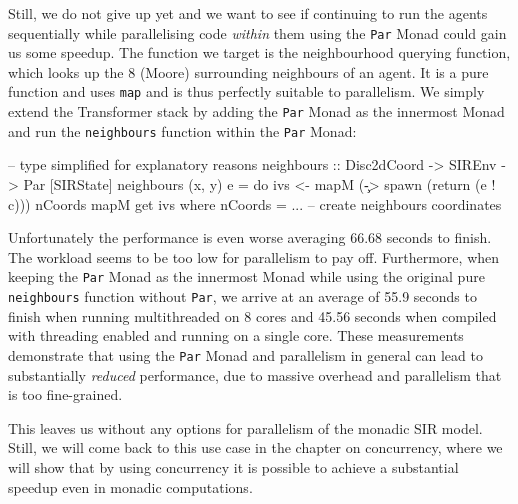 Still, we do not give up yet and we want to see if continuing to run the agents sequentially while parallelising code \textit{within} them using the \texttt{Par} Monad could gain us some speedup. The function we target is the neighbourhood querying function, which looks up the 8 (Moore) surrounding neighbours of an agent. It is a pure function and uses \texttt{map} and is thus perfectly suitable to parallelism. We simply extend the Transformer stack by adding the \texttt{Par} Monad as the innermost Monad and run the \texttt{neighbours} function within the \texttt{Par} Monad:

\begin{HaskellCode}
-- type simplified for explanatory reasons
neighbours :: Disc2dCoord -> SIREnv -> Par [SIRState]
neighbours (x, y) e = do
    ivs <- mapM (\c -> spawn (return (e ! c))) nCoords
    mapM get ivs
  where
    nCoords = ... -- create neighbours coordinates
\end{HaskellCode}

Unfortunately the performance is even worse averaging 66.68 seconds to finish. The workload seems to be too low for parallelism to pay off. Furthermore, when keeping the \texttt{Par} Monad as the innermost Monad while using the original pure \texttt{neighbours} function without \texttt{Par}, we arrive at an average of 55.9 seconds to finish when running multithreaded on 8 cores and 45.56 seconds when compiled with threading enabled and running on a single core. These measurements demonstrate that using the \texttt{Par} Monad and parallelism in general can lead to substantially \textit{reduced} performance, due to massive overhead and parallelism that is too fine-grained.

This leaves us without any options for parallelism of the monadic SIR model. Still, we will come back to this use case in the chapter on concurrency, where we will show that by using concurrency it is possible to achieve a substantial speedup even in monadic computations.
